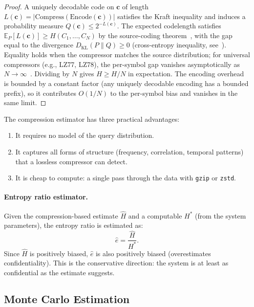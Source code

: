 \documentclass[11pt]{article}
\theoremstyle{definition}
\theoremstyle{plain}
\theoremstyle{remark}
\begin{document}
\begin{proof}
A uniquely decodable code on $\mathbf{c}$ of length
$L(\mathbf{c}) = |\mathrm{Compress}(\mathrm{Encode}(\mathbf{c}))|$
satisfies the Kraft inequality and induces a probability measure
$Q(\mathbf{c}) \leq 2^{-L(\mathbf{c})}$.  The expected codelength
satisfies $\mathbb{E}_P[L(\mathbf{c})] \geq H(C_1, \ldots, C_N)$ by
the source-coding theorem~\cite{shannon1948mathematical}, with the gap
equal to the divergence $D_{\mathrm{KL}}(P \| Q) \geq 0$ (cross-entropy
inequality, see~\cite[Thm.~5.4.3]{cover2006elements}).  Equality holds
when the compressor matches the source distribution; for universal
compressors (e.g., LZ77, LZ78), the per-symbol gap vanishes
asymptotically as $N \to \infty$~\cite{shannon1948mathematical}.
Dividing by $N$ gives $\hat{H} \geq H/N$ in expectation.  The
encoding overhead is bounded by a constant factor (any uniquely
decodable encoding has a bounded prefix), so it contributes
$O(1/N)$ to the per-symbol bias and vanishes in the same limit.
\end{proof}

The compression estimator has three practical advantages:
\begin{enumerate}
\item It requires no model of the query distribution.
\item It captures all forms of structure (frequency, correlation,
  temporal patterns) that a lossless compressor can detect.
\item It is cheap to compute: a single pass through the data with
  \texttt{gzip} or \texttt{zstd}.
\end{enumerate}

\paragraph{Entropy ratio estimator.}
Given the compression-based estimate $\hat{H}$ and a computable
$H^*$ (from the system parameters), the entropy ratio is estimated as:
\begin{equation}
\hat{e} = \frac{\hat{H}}{H^*}.
\end{equation}
Since $\hat{H}$ is positively biased, $\hat{e}$ is also positively
biased (overestimates confidentiality).  This is the conservative
direction: the system is at least as confidential as the estimate suggests.

\subsection{Monte Carlo Estimation}
\end{document}
